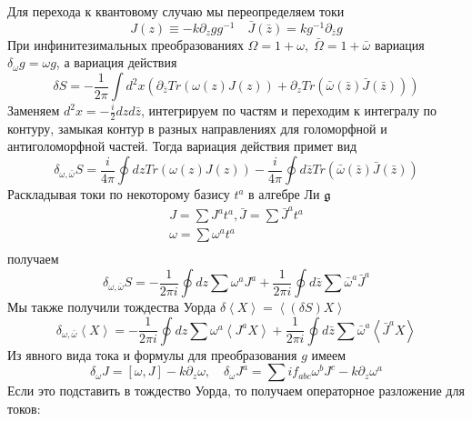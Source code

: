 Для перехода к квантовому случаю мы переопределяем токи
\begin{equation}
  \label{eq:82}
  J(z)\equiv -k \partial_zg g^{-1}\quad \bar J(\bar z)=k g^{-1}\partial_{\bar z}g
\end{equation}
 При инфинитезимальных преобразованиях $\Omega=1+\omega,\; \bar \Omega =1+\bar \omega$ вариация
 $\delta_{\omega}g=\omega g$, а вариация действия
 \begin{equation}
   \label{eq:11}
   \delta S=-\frac{1}{2\pi}\int d^2 x \left(\partial_{\bar z}Tr(\omega(z)J(z))+\partial_z Tr(\bar
     \omega(\bar z)\bar J(\bar z))\right)
 \end{equation}
Заменяем $d^2 x=-\frac{i}{2} dz d\bar z$, интегрируем по частям и переходим к интегралу по контуру, замыкая
контур в разных направлениях для голоморфной и антиголоморфной частей.
Тогда вариация действия примет вид
\begin{equation}
  \label{eq:83}
  \delta_{\omega,\bar\omega}S=\frac{i}{4\pi}\oint dz Tr (\omega(z)J(z))-\frac{i}{4\pi}\oint d\bar z Tr(\bar\omega(\bar z)\bar J(\bar z))
\end{equation}
Раскладывая токи по некоторому базису $t^{a}$ в алгебре Ли $\mathfrak{g}$
\begin{equation}
  \label{eq:85}
  \begin{aligned}
    J=\sum J^a t^a,\bar J=\sum \bar J^a t^a \\
    \omega=\sum \omega^a t^a\\
  \end{aligned}
\end{equation}
получаем
\begin{equation}
  \label{eq:86}
  \delta_{\omega,\bar \omega}S=-\frac{1}{2\pi i}\oint dz \sum\omega^a J^a+\frac{1}{2\pi i} \oint d\bar z \sum \bar \omega^a \bar J^a
\end{equation}
Мы также получили тождества Уорда $\delta\left< X\right>=\left<(\delta S)X\right>$
\begin{equation}
  \label{eq:87}
  \delta_{\omega,\bar \omega}\left< X \right>=-\frac{1}{2\pi i}\oint dz \sum\omega^a \left< J^a X\right>+
  \frac{1}{2\pi i} \oint d\bar z \sum \bar \omega^a \left< \bar J^a X\right>
\end{equation}
Из явного вида тока и формулы для преобразования $g$ имеем
\begin{equation}
  \label{eq:88}
  \delta_{\omega}J=[\omega,J]-k\partial_z\omega,\quad \delta_{\omega}J^a=\sum i f_{abc}\omega^b J^c-k\partial_z\omega^a
\end{equation}
Если это подставить в тождество Уорда, то получаем операторное разложение для токов:
